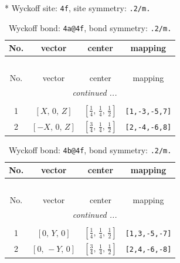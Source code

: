 \documentclass[fleqn,8pt]{jsarticle}
\begin{document}
* Wyckoff site: {\tt 4f}, site symmetry: {\tt .2/m.}
\renewcommand{\arraystretch}{1.2}
\begin{longtable}{cccc}
\caption{Wyckoff bond: {\tt 4a@4f}, bond symmetry: {\tt .2/m.}}
 \\
 \hline \hline
No. & vector & center & mapping \\ \hline \endfirsthead

\multicolumn{3}{l}{\tablename\ \thetable{}} \\
 \hline \hline
No. & vector & center & mapping \\ \hline \endhead

 \hline \hline
\multicolumn{3}{r}{\footnotesize\it continued ...} \\ \endfoot

 \hline \hline
\multicolumn{3}{r}{} \\ \endlastfoot

1 & $\left[ X,\, 0,\, Z \right]$ & $\left[ \frac{1}{4},\, \frac{1}{4},\, \frac{1}{2} \right]$ & {\tt [1,-3,-5,7]} \\ \hline
2 & $\left[ - X,\, 0,\, Z \right]$ & $\left[ \frac{3}{4},\, \frac{1}{4},\, \frac{1}{2} \right]$ & {\tt [2,-4,-6,8]} \\
\end{longtable}
\renewcommand{\arraystretch}{1.2}
\begin{longtable}{cccc}
\caption{Wyckoff bond: {\tt 4b@4f}, bond symmetry: {\tt .2/m.}}
 \\
 \hline \hline
No. & vector & center & mapping \\ \hline \endfirsthead

\multicolumn{3}{l}{\tablename\ \thetable{}} \\
 \hline \hline
No. & vector & center & mapping \\ \hline \endhead

 \hline \hline
\multicolumn{3}{r}{\footnotesize\it continued ...} \\ \endfoot

 \hline \hline
\multicolumn{3}{r}{} \\ \endlastfoot

1 & $\left[ 0,\, Y,\, 0 \right]$ & $\left[ \frac{1}{4},\, \frac{1}{4},\, \frac{1}{2} \right]$ & {\tt [1,3,-5,-7]} \\ \hline
2 & $\left[ 0,\, - Y,\, 0 \right]$ & $\left[ \frac{3}{4},\, \frac{1}{4},\, \frac{1}{2} \right]$ & {\tt [2,4,-6,-8]} \\
\end{longtable}
\renewcommand{\arraystretch}{1.2}
\end{document}
